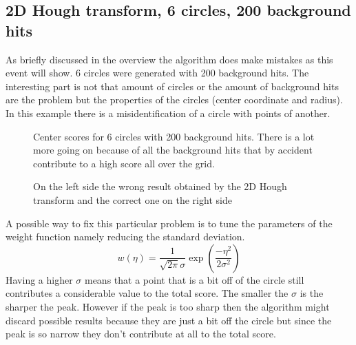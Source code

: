 \documentclass[11pt,twoside]{scrreprt}
\begin{document}

\subsection{2D Hough transform, 6 circles, 200 background hits} %
\label{sub:2d_hough_transform_6_circles_200_background_hits}
As briefly discussed in the overview the algorithm does make mistakes as this event will show. 6 circles 
were generated with 200 background hits. The interesting part is not that amount of circles or the amount
of background hits are the problem but the properties of the circles (center coordinate and radius). In 
this example there is a misidentification of a circle with points of another.

\begin{figure}
\centering

  \caption[Center scores for 6 circles with 200 background hits.]{Center scores for 6 circles with 200 background hits. There is a lot more going on because of all the background hits that by accident contribute to a high score all over the grid.}

\caption{On the left side the wrong result obtained by the 2D Hough transform and the correct one on the right side}
\end{figure}

A possible way to fix this particular problem is to tune the parameters of the weight function namely reducing the standard deviation. 
\[
  w(\eta) = \frac{1}{\sqrt{2\pi}\sigma}\exp\left( \frac{-\eta^2}{2\sigma^2}\right)
\]
Having a higher $\sigma$ means that a point that is a bit off of the circle still contributes a considerable value to the total score. The smaller the $\sigma$ is the sharper the peak. However if the peak is too sharp then the algorithm might discard possible results because they are just a bit off the circle but since the peak is so narrow they don't contribute at all to the total score.
\end{document}
